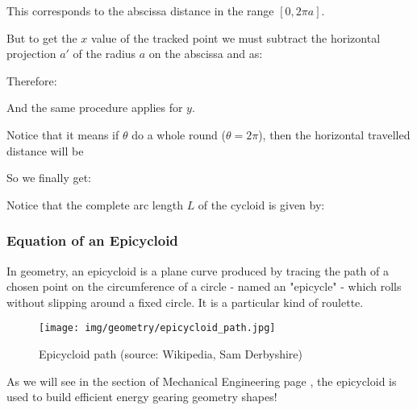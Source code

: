 	This corresponds to the abscissa distance in the range $[0,2\pi a]$.
	
	But to get the $x$  value of the tracked point we must subtract the horizontal projection $a'$ of the radius $a$ on the abscissa and as:
	
	Therefore:
	
	And the same procedure applies for $y$.
	
	\begin{tcolorbox}[title=Remark,colframe=black,arc=10pt]
	Notice that it means if $\theta$ do a whole round ($\theta=2\pi$), then the horizontal travelled distance will be 
	\end{tcolorbox}

	So we finally get:
	
	Notice that the complete arc length $L$ of the cycloid is given by:
	
	
	\subsubsection{Equation of an Epicycloid}
	In geometry, an epicycloid is a plane curve produced by tracing the path of a chosen point on the circumference of a circle - named an "epicycle" - which rolls without slipping around a fixed circle. It is a particular kind of roulette.
	\begin{figure}[H]
		\centering
		\texttt{[image: img/geometry/epicycloid\_path.jpg]}
		\caption[Epicycloid path]{Epicycloid path (source: Wikipedia, Sam Derbyshire)}
	\end{figure}
	As we will see in the section of Mechanical Engineering page \pageref{epicyclic gears}, the epicycloid is used to build efficient energy gearing geometry shapes!
	
